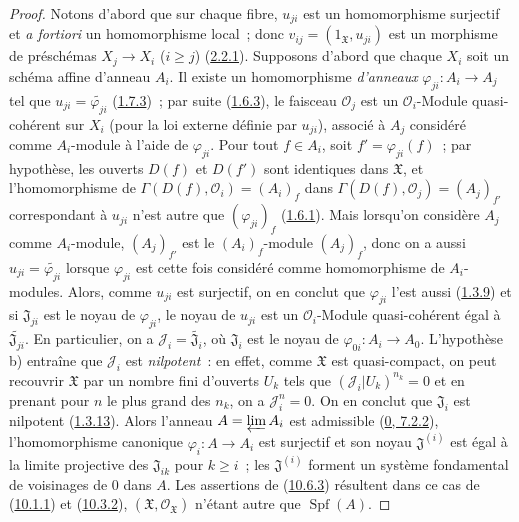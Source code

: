 \begin{proof}
Notons d'abord que sur chaque fibre, $u_{ji}$ est un homomorphisme
surjectif et \emph{a fortiori} un homomorphisme local~; donc
$v_{ij}=(1_{\mathfrak{X}},u_{ji})$ est un morphisme de préschémas
$X_j\to X_i$ ($i\geq j$) (\hyperref[I.2.2.1-fr]{2.2.1}). Supposons
d'abord que chaque $X_i$ soit un schéma affine d'anneau $A_i$. Il existe
un homomorphisme \emph{d'anneaux}
$\varphi_{ji}:A_i\to A_j$ tel que
$u_{ji}=\widetilde{\varphi_{ji}}$
(\hyperref[I.1.7.3-fr]{1.7.3})~; par suite
(\hyperref[I.1.6.3-fr]{1.6.3}), le faisceau $\mathscr{O}_j$ est un
$\mathscr{O}_i$-Module quasi-cohérent sur $X_i$ (pour la loi externe
définie par $u_{ji}$), associé à $A_j$ considéré comme $A_i$-module à
l'aide de $\varphi_{ji}$. Pour tout $f\in A_i$, soit
$f'=\varphi_{ji}(f)$~; par hypothèse, les ouverts $D(f)$ et $D(f')$ sont
identiques dans $\mathfrak{X}$, et l'homomorphisme de
$\Gamma(D(f),\mathscr{O}_i)=(A_i)_f$ dans
$\Gamma(D(f),\mathscr{O}_j)=(A_j)_{f'}$ correspondant à $u_{ji}$ n'est
autre que $(\varphi_{ji})_f$ (\hyperref[I.1.6.1-fr]{1.6.1}). Mais
lorsqu'on considère $A_j$ comme $A_i$-module, $(A_j)_{f'}$ est le
$(A_i)_f$-module $(A_j)_f$, donc on a aussi
$u_{ji}=\widetilde{\varphi_{ji}}$ lorsque $\varphi_{ji}$ est cette fois
considéré comme homomorphisme de $A_i$-modules. Alors, comme $u_{ji}$ est
surjectif, on en conclut que $\varphi_{ji}$ l'est aussi
(\hyperref[I.1.3.9-fr]{1.3.9}) et si $\mathfrak{J}_{ji}$ est le noyau de
$\varphi_{ji}$, le noyau de $u_{ji}$ est un $\mathscr{O}_i$-Module
quasi-cohérent égal à $\widetilde{\mathfrak{J}_{ji}}$. En particulier,
on a $\mathscr{J}_i=\widetilde{\mathfrak{J}_i}$, où $\mathfrak{J}_i$ est
le noyau de $\varphi_{0i}:A_i\to A_0$. L'hypothèse b) entraîne que
$\mathscr{J}_i$ est \emph{nilpotent}~: en effet, comme $\mathfrak{X}$
est quasi-compact, on peut recouvrir $\mathfrak{X}$ par un nombre fini
d'ouverts $U_k$ tels que $(\mathscr{J}_i|U_k)^{n_k}=0$ et en prenant pour
$n$ le plus grand des $n_k$, on a $\mathscr{J}_i^n=0$. On en conclut que
$\mathfrak{J}_i$ est nilpotent (\hyperref[I.1.3.13-fr]{1.3.13}). Alors
l'anneau $A=\varprojlim A_i$ est admissible
(\hyperref[0.7.2.2-fr]{0, 7.2.2}), l'homomorphisme canonique
$\varphi_i:A\to A_i$ est surjectif et son noyau
$\mathfrak{J}^{(i)}$ est égal à la limite projective des
$\mathfrak{J}_{ik}$ pour $k\geq i$~; les $\mathfrak{J}^{(i)}$ forment
un système fondamental de voisinages de 0 dans $A$. Les assertions de
(\hyperref[I.10.6.3-fr]{10.6.3}) résultent dans ce cas de
(\hyperref[I.10.1.1-fr]{10.1.1}) et
(\hyperref[I.10.3.2-fr]{10.3.2}),
$(\mathfrak{X},\mathscr{O}_{\mathfrak{X}})$ n'étant autre que
$\operatorname{Spf}(A)$.


\end{proof}
